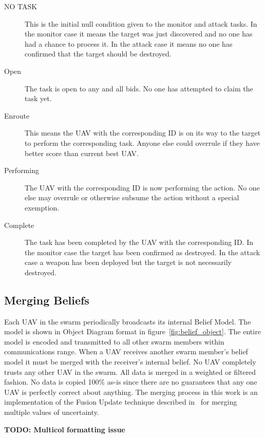 \begin{multicols*}{2}
\begin{description}
	\item [NO TASK] This is the initial null condition given to the monitor and attack tasks.  In the monitor case it means the target was just discovered and no one has had a chance to process it.  In the attack case it means no one has confirmed that the target should be destroyed.
	\item [Open] The task is open to any and all bids.  No one has attempted to claim the task yet.
	\item [Enroute] This means the UAV with the corresponding ID is on its way to the target to perform the corresponding task.  Anyone else could overrule if they have better score than current best UAV.
	\item [Performing] The UAV with the corresponding ID is now performing the action.  No one else may overrule or otherwise subsume the action without a special exemption.%
	\item [Complete] The task has been completed by the UAV with the corresponding ID.  In the monitor case the target has been confirmed as destroyed.  In the attack case a weapon has been deployed but the target is not necessarily destroyed.
\end{description}

\subsection{Merging Beliefs}
\label{sec:mergingBeliefs}
Each UAV in the swarm periodically broadcasts its internal Belief Model.  The model is shown in Object Diagram format in figure~\ref{fig:belief_object}.  The entire model is encoded and transmitted to all other swarm members within communications range.   When a UAV receives another swarm member's belief model it must be merged with the receiver's internal belief.  No UAV completely trusts any other UAV in the swarm.  All data is merged in a weighted or filtered fashion.  No data is copied 100\% as-is since there are no guarantees that any one UAV is perfectly correct about anything.  The merging process in this work is an implementation of the Fusion Update technique described in~\cite{shem} for merging multiple values of uncertainty.

\textbf{TODO: Multicol formatting issue}
\end{multicols*}
